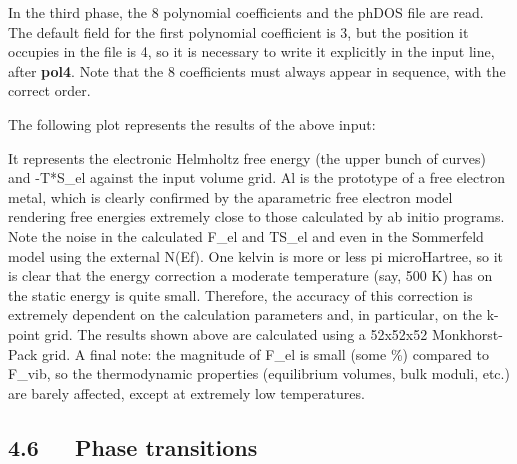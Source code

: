 \documentclass[a4paper]{article}
\begin{document}
In the third phase, the 8 polynomial coefficients and the phDOS file
are read. The default field for the first polynomial coefficient is 3,
but the position it occupies in the file is 4, so it is necessary to
write it explicitly in the input line, after \textbf{pol4}. Note that the 8
coefficients must always appear in sequence, with the correct order.

The following plot represents the results of the above input:

\noindent{}

It represents the electronic Helmholtz free energy (the upper bunch of
curves) and -T*S\_el against the input volume grid. Al is the prototype
of a free electron metal, which is clearly confirmed by the
aparametric free electron model rendering free energies extremely
close to those calculated by ab initio programs. Note the noise in the
calculated F\_el and TS\_el and even in the Sommerfeld model using the
external N(Ef). One kelvin is more or less pi microHartree, so it is
clear that the energy correction a moderate temperature (say, 500 K)
has on the static energy is quite small. Therefore, the accuracy of
this correction is extremely dependent on the calculation parameters
and, in particular, on the k-point grid. The results shown above are
calculated using a 52x52x52 Monkhorst-Pack grid. A final note: the
magnitude of F\_el is small (some \%) compared to F\_vib, so the
thermodynamic properties (equilibrium volumes, bulk moduli, etc.) are
barely affected, except at extremely low temperatures.


\subsection{4.6~~~Phase transitions%
  \label{phase-transitions}%
}
\end{document}
